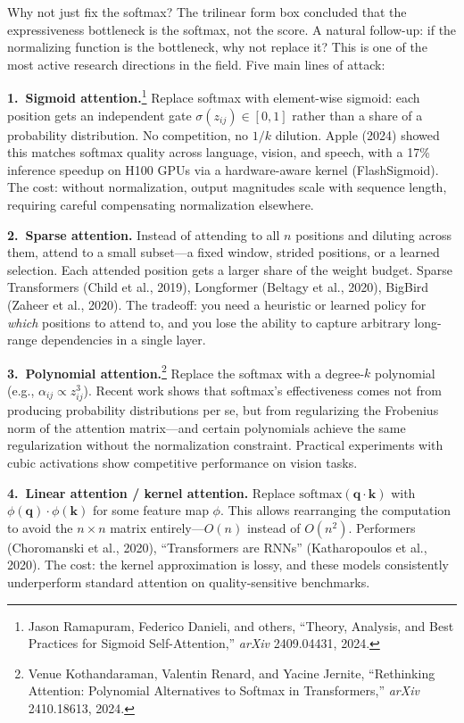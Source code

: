 \begin{whynotbox}{Why not just fix the softmax?}
The trilinear form box concluded that the expressiveness bottleneck is the softmax, not the score. A natural follow-up: if the normalizing function is the bottleneck, why not replace it? This is one of the most active research directions in the field. Five main lines of attack:

\textbf{1.\ Sigmoid attention.}\footnote{Jason Ramapuram, Federico Danieli, and others, ``Theory, Analysis, and Best Practices for Sigmoid Self-Attention,'' \emph{arXiv} 2409.04431, 2024.} Replace softmax with element-wise sigmoid: each position gets an independent gate $\sigma(z_{ij}) \in [0, 1]$ rather than a share of a probability distribution. No competition, no $1/k$ dilution. Apple (2024) showed this matches softmax quality across language, vision, and speech, with a 17\% inference speedup on H100 GPUs via a hardware-aware kernel (FlashSigmoid). The cost: without normalization, output magnitudes scale with sequence length, requiring careful compensating normalization elsewhere.

\textbf{2.\ Sparse attention.} Instead of attending to all $n$ positions and diluting across them, attend to a small subset---a fixed window, strided positions, or a learned selection. Each attended position gets a larger share of the weight budget. Sparse Transformers (Child et al., 2019), Longformer (Beltagy et al., 2020), BigBird (Zaheer et al., 2020). The tradeoff: you need a heuristic or learned policy for \emph{which} positions to attend to, and you lose the ability to capture arbitrary long-range dependencies in a single layer.

\textbf{3.\ Polynomial attention.}\footnote{Venue Kothandaraman, Valentin Renard, and Yacine Jernite, ``Rethinking Attention: Polynomial Alternatives to Softmax in Transformers,'' \emph{arXiv} 2410.18613, 2024.} Replace the softmax with a degree-$k$ polynomial (e.g., $\alpha_{ij} \propto z_{ij}^3$). Recent work shows that softmax's effectiveness comes not from producing probability distributions per se, but from regularizing the Frobenius norm of the attention matrix---and certain polynomials achieve the same regularization without the normalization constraint. Practical experiments with cubic activations show competitive performance on vision tasks.

\textbf{4.\ Linear attention / kernel attention.} Replace $\text{softmax}(\mathbf{q} \cdot \mathbf{k})$ with $\phi(\mathbf{q}) \cdot \phi(\mathbf{k})$ for some feature map $\phi$. This allows rearranging the computation to avoid the $n \times n$ matrix entirely---$O(n)$ instead of $O(n^2)$. Performers (Choromanski et al., 2020), ``Transformers are RNNs'' (Katharopoulos et al., 2020). The cost: the kernel approximation is lossy, and these models consistently underperform standard attention on quality-sensitive benchmarks.


\end{whynotbox}
